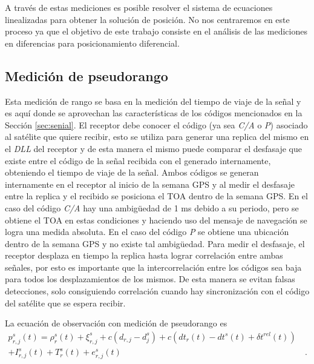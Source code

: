\documentclass[a4paper,12pt,oneside,onecolumn,final,openright]{book}%
\begin{document}
	A través de estas mediciones es posible resolver el sistema de ecuaciones linealizadas para obtener la solución de posición. No nos centraremos en este proceso ya que el objetivo de este trabajo consiste en el análisis de las mediciones en diferencias para posicionamiento diferencial. 
	
\subsection{Medición de pseudorango}
	Esta medición de rango se basa en la medición del tiempo de viaje de la señal y es aquí donde se aprovechan las características de los códigos mencionados en la Sección \ref{sec:senial}. El receptor debe conocer el código (ya sea \textit{C/A} o \textit{P}) asociado al satélite que quiere recibir, esto se utiliza para generar una replica del mismo en el \textit{DLL} del receptor y de esta manera el mismo puede comparar el desfasaje que existe entre el código de la señal recibida con el generado internamente, obteniendo el tiempo de viaje de la señal. Ambos códigos se generan internamente en el receptor al inicio de la semana GPS y al medir el desfasaje entre la replica y el recibido se posiciona el TOA dentro de la semana GPS. En el caso del código \textit{C/A} hay una ambigüedad de 1 ms debido a su periodo, pero se obtiene el TOA en estas condiciones y haciendo uso del mensaje de navegación se logra una medida absoluta. En el caso del código \textit{P} se obtiene una ubicación dentro de la semana GPS y no existe tal ambigüedad. Para medir el desfasaje, el receptor desplaza en tiempo la replica hasta lograr correlación entre ambas señales, por esto es importante que la intercorrelación entre los códigos sea baja para todos los desplazamientos de los mismos. De esta manera se evitan falsas detecciones, solo consiguiendo correlación cuando hay sincronización con el código del satélite que se espera recibir.
	
	La ecuación de observación con medición de pseudorango es 
\begin{align}\label{ec:obs_pseudorango}
	p_{r,j}^s(t) = \rho_r^s(t) + \xi_{r,j}^s + c\left(d_{r,j}-d_j^s\right) + c\left(dt_r(t)-dt^s(t)+\delta t^{rel}(t)\right)& \\ 
	+ I_{r,j}^s(t) + T_r^s(t) +e_{r,j}^s(t)& \ . \nonumber
\end{align}
\end{document}
